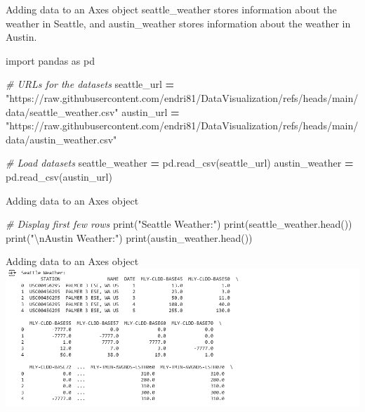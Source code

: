 \documentclass[
  ignorenonframetext,
]{beamer}
\newenvironment{Shaded}{\begin{snugshade}}{\end{snugshade}}
\newcommand{\BuiltInTok}[1]{#1}
\newcommand{\CharTok}[1]{\textcolor[rgb]{0.31,0.60,0.02}{#1}}
\newcommand{\CommentTok}[1]{\textcolor[rgb]{0.56,0.35,0.01}{\textit{#1}}}
\newcommand{\ImportTok}[1]{#1}
\newcommand{\NormalTok}[1]{#1}
\newcommand{\OperatorTok}[1]{\textcolor[rgb]{0.81,0.36,0.00}{\textbf{#1}}}
\newcommand{\StringTok}[1]{\textcolor[rgb]{0.31,0.60,0.02}{#1}}
\begin{document}
\begin{frame}[fragile]{Adding data to an Axes object}
\label{adding-data-to-an-axes-object-1}
seattle\_weather stores information about the weather in Seattle, and
austin\_weather stores information about the weather in Austin.


\begin{Shaded}
\begin{Highlighting}[]
\ImportTok{import}\NormalTok{ pandas }\ImportTok{as}\NormalTok{ pd}

\CommentTok{\# URLs for the datasets}
\NormalTok{seattle\_url }\OperatorTok{=} \StringTok{"https://raw.githubusercontent.com/endri81/DataVisualization/refs/heads/main/data/seattle\_weather.csv"}
\NormalTok{austin\_url }\OperatorTok{=} \StringTok{"https://raw.githubusercontent.com/endri81/DataVisualization/refs/heads/main/data/austin\_weather.csv"}

\CommentTok{\# Load datasets}
\NormalTok{seattle\_weather }\OperatorTok{=}\NormalTok{ pd.read\_csv(seattle\_url)}
\NormalTok{austin\_weather }\OperatorTok{=}\NormalTok{ pd.read\_csv(austin\_url)}
\end{Highlighting}
\end{Shaded}
\end{frame}

\begin{frame}[fragile]{Adding data to an Axes object}
\label{adding-data-to-an-axes-object-2}

\begin{Shaded}
\begin{Highlighting}[]
\CommentTok{\# Display first few rows}
\BuiltInTok{print}\NormalTok{(}\StringTok{"Seattle Weather:"}\NormalTok{)}
\BuiltInTok{print}\NormalTok{(seattle\_weather.head())}
\BuiltInTok{print}\NormalTok{(}\StringTok{"}\CharTok{\textbackslash{}n}\StringTok{Austin Weather:"}\NormalTok{)}
\BuiltInTok{print}\NormalTok{(austin\_weather.head())}
\end{Highlighting}
\end{Shaded}
\end{frame}

\begin{frame}{Adding data to an Axes object}
\label{adding-data-to-an-axes-object-3}
\includegraphics{../images/im225.png}
\end{frame}
\end{document}
